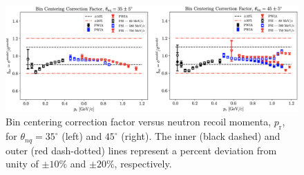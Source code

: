 \documentclass[aps, prl]{revtex4-2}  %
\begin{document}
\begin{figure}[!h]
\includegraphics[scale=0.26]{plots/BC_factor.png}
\caption{Bin centering correction factor versus neutron recoil momenta, $p_{\mathrm{r}}$, for $\theta_{nq}=35^{\circ}$ (left) and $45^{\circ}$ (right).
  The inner (black dashed) and outer (red dash-dotted) lines represent a percent deviation from unity of $\pm10\%$ and $\pm20\%$, respectively.}
\label{fig:BC_factor}
\end{figure}\\
\end{document}
